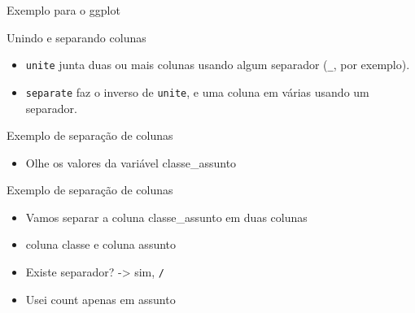 \documentclass[
  9pt,
  ignorenonframetext,
]{beamer}
\providecommand{\tightlist}{%
  \setlength{\itemsep}{0pt}\setlength{\parskip}{0pt}}
\begin{document}
\begin{frame}{Exemplo para o ggplot}
\protect\hypertarget{exemplo-para-o-ggplot}{}
\end{frame}

\begin{frame}[fragile]{Unindo e separando colunas}
\protect\hypertarget{unindo-e-separando-colunas}{}
\begin{itemize}
\tightlist
\item
  \texttt{unite} junta duas ou mais colunas usando algum separador
  (\texttt{\_}, por exemplo).
\item
  \texttt{separate} faz o inverso de \texttt{unite}, e uma coluna em
  várias usando um separador.
\end{itemize}
\end{frame}

\begin{frame}{Exemplo de separação de colunas}
\protect\hypertarget{exemplo-de-separauxe7uxe3o-de-colunas}{}
\begin{itemize}
\tightlist
\item
  Olhe os valores da variável classe\_assunto
\end{itemize}
\end{frame}

\begin{frame}[fragile]{Exemplo de separação de colunas}
\protect\hypertarget{exemplo-de-separauxe7uxe3o-de-colunas-1}{}
\begin{itemize}
\item
  Vamos separar a coluna classe\_assunto em duas colunas
\item
  coluna classe e coluna assunto
\item
  Existe separador? -\textgreater{} sim, \texttt{/}
\item
  Usei count apenas em assunto
\end{itemize}
\end{frame}
\end{document}
